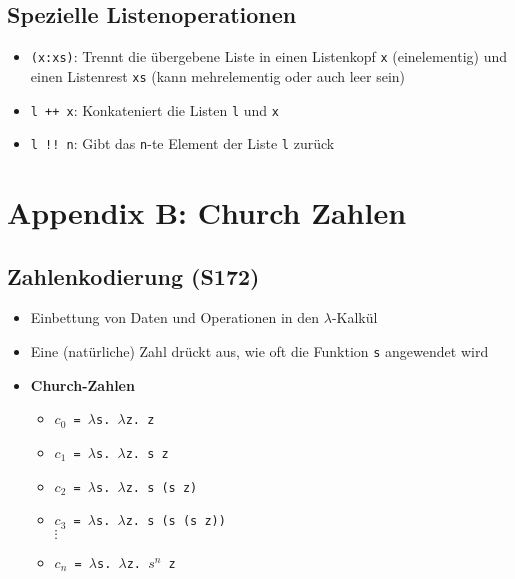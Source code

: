 \subsection{Spezielle Listenoperationen}
\begin{itemize}
	\item \texttt{(x:xs)}: Trennt die übergebene Liste in einen Listenkopf \texttt{x} (einelementig) und einen Listenrest \texttt{xs} (kann mehrelementig oder auch leer sein)
	\item \texttt{l ++ x}: Konkateniert die Listen \texttt{l} und \texttt{x}
	\item \texttt{l !! n}: Gibt das \texttt{n}-te Element der Liste \texttt{l} zurück 
\end{itemize}


\section{Appendix B: Church Zahlen}

\subsection{Zahlenkodierung (S172)}
\begin{itemize}
	\item Einbettung von Daten und Operationen in den \(\lambda\)-Kalkül
	\item Eine (natürliche) Zahl drückt aus, wie oft die Funktion \texttt{s} angewendet wird
	\item \textbf{Church-Zahlen}
	\begin{itemize}
		\item \texttt{\(c_0\) = \(\lambda\)s. \(\lambda\)z. z}
		\item \texttt{\(c_1\) = \(\lambda\)s. \(\lambda\)z. s z}
		\item \texttt{\(c_2\) = \(\lambda\)s. \(\lambda\)z. s (s z)}
		\item \texttt{\(c_3\) = \(\lambda\)s. \(\lambda\)z. s (s (s z))} \\ \(\vdots\)
		\item \texttt{\(c_n\) = \(\lambda\)s. \(\lambda\)z. \(s^n\) z}
	\end{itemize}
\end{itemize}


